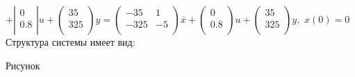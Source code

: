 \documentclass[preprint,russian,a5paper,10pt,twoside,mediummath]{ncc}
\begin{document}
$+\left| \begin{matrix}
   0  \\
   0.8  \\
\end{matrix} \right|u+\left( \begin{matrix}
   35  \\
   325  \\
\end{matrix} \right)y=\left( \begin{matrix}
   -35 & 1  \\
   -325 & -5  \\
\end{matrix} \right)\bar{x}+\left( \begin{matrix}
   0  \\
   0.8  \\
\end{matrix} \right)u+\left( \begin{matrix}
   35  \\
   325  \\
\end{matrix} \right)y,\,\,x(0)=0$ 
Структура системы имеет вид:

\par 
\par	Рисунок
\par
\end{document}
